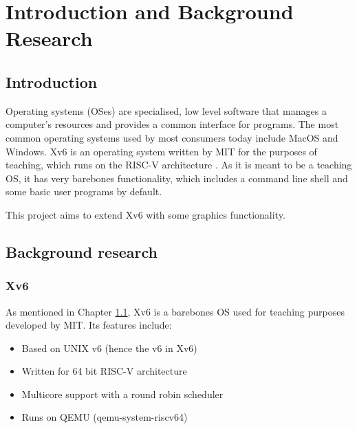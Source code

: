 \chapter{Introduction and Background Research}

\label{chapter1}

\section{Introduction}
\label{chapter1:introduction}

Operating systems (OSes) are specialised, low level software that manages a computer's
resources and provides a common interface for programs. The most common operating
systems used by most consumers today include MacOS and Windows. Xv6 is an operating
system written by MIT for the purposes of teaching, which runs on the RISC-V architecture \cite{xv6:book}\cite{xv6:code}.
As it is meant to be a teaching OS, it has very barebones functionality,
which includes a command line shell and some basic user programs by default.

This project aims to extend Xv6 with some graphics functionality.


\section{Background research}
\subsection{Xv6}
As mentioned in Chapter \ref{chapter1:introduction}, Xv6 is a barebones OS used for teaching purposes developed by MIT.
Its features include:
\begin{itemize}
    \item Based on UNIX v6 (hence the v6 in Xv6)
    \item Written for 64 bit RISC-V architecture
    \item Multicore support with a round robin scheduler
    \item Runs on QEMU (qemu-system-riscv64)
\end{itemize}

